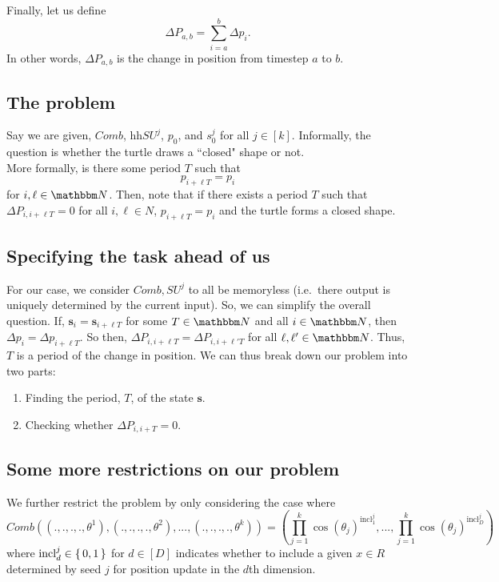 \documentclass[11pt,titlepage]{article}
\newcommand{\inclIndic}[2]{{\mathrm{incl}_{#1}^{#2}}}
\newcommand{\combSingleTerm}[1]{\prod_{j=1}^k \cos(\theta_j) ^ {\inclIndic{#1}{j}}}
\begin{document}
Finally, let us define
$$
  \Delta P_{a, b} = \sum_{i = a}^{b} \Delta p_i.
$$
In other words, $\Delta P_{a, b}$ is the change in position from timestep $a$ to $b$.

\subsection{The problem}
Say we are given, $Comb$, hh$SU^j$, $p_0$, and $s^j_0$ for all $j \in [k]$.
Informally, the question is whether the turtle draws a ``closed" shape or not.\\
More formally, is there some period $T$ such that 
$$
  p_{i + \ell T} = p_{i}
$$
for $i, \ell \in \N$.
Then, note that if there exists a period $T$ such that 
$\Delta P_{i, i + \ell T} = 0$ for all $i, \ell \in N$, 
$p_{i + \ell T} = p_{i}$ and the turtle forms a closed shape.


\subsection{Specifying the task ahead of us}
For our case, we consider $Comb, SU^j$ to all be memoryless (i.e.\ there output
is uniquely determined by the current input). So, we can simplify the overall question.
If, $\pmb{s}_i = \pmb{s}_{i + \ell T}$ for some $T \in \N$ and all $i \in \N$, then 
$\Delta p_{i} = \Delta p_{i + \ell T}$. So then,
$\Delta P_{i, i + \ell T} = \Delta P_{i, i + \ell' T}$ for all $\ell, \ell' \in \N$.
Thus, $T$ is a period of the change in position. We can thus
break down our problem into two parts:
\begin{enumerate}
  \item Finding the period, $T$, of the state $\pmb{s}$.
  \item Checking whether $\Delta P_{i, i + T} = 0$.
\end{enumerate}

\subsection{Some more restrictions on our problem}
We further restrict the problem by only considering the case where
$$
  Comb((., ., ., ., \theta^1), (., ., ., ., \theta^2), ..., (., ., ., ., \theta^k)) =
    \left(\combSingleTerm{1}, ..., \combSingleTerm{D}\right)
$$
where $\mathrm{incl}_d^j \in \set{0, 1}$ for $d \in [D]$ indicates whether to include a given
$x \in R$ determined by seed $j$ for position update in the $d$th dimension.
\end{document}
